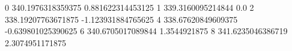 0 340.1976318359375 0.881622314453125
1 339.3160095214844 0.0
2 338.19207763671875 -1.123931884765625
4 338.67620849609375 -0.639801025390625
6 340.6705017089844 1.3544921875
8 341.6235046386719 2.3074951171875
